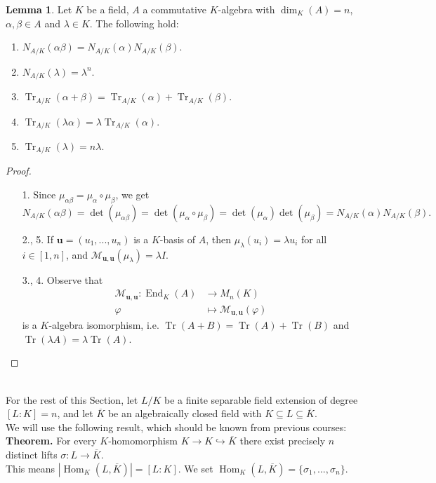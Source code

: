 \documentclass[12pt,a4paper]{report}
\theoremstyle{definition}
\newtheorem{lemma}[theorem]{Lemma}
\theoremstyle{num.custom-title}
\DeclareMathOperator{\Hom}{Hom}
\DeclareMathOperator{\End}{End}
\DeclareMathOperator{\sse}{\subseteq}
\DeclareMathOperator{\Tr}{Tr}
\newcommand{\ol}{\overline}
\newcommand{\M}{\mathcal{M}}
\renewcommand{\phi}{\varphi}
\renewcommand{\u}{\mathbf{u}}
\begin{document}
\begin{lemma}
Let $K$ be a field, $A$ a commutative $K$-algebra with $\dim_K(A)=n$, $\alpha,\beta \in A$ and $\lambda \in K$. The following hold:
\begin{enumerate}
\item $N_{A/K}(\alpha\beta)=N_{A/K}(\alpha)N_{A/K}(\beta)$.
\item $N_{A/K}(\lambda)=\lambda^n$.
\item $\Tr_{A/K}(\alpha + \beta) = \Tr_{A/K}(\alpha) + \Tr_{A/K}(\beta)$.
\item $\Tr_{A/K}(\lambda \alpha) = \lambda \Tr_{A/K}(\alpha)$.
\item $\Tr_{A/K}(\lambda) = n\lambda$.
\end{enumerate}
\begin{proof}\ 
\begin{itemize}
\item[1.] Since $\mu_{\alpha\beta}=\mu_\alpha \circ \mu_\beta$, we get
\[
N_{A/K}(\alpha\beta) = \det(\mu_{\alpha\beta}) = \det(\mu_\alpha \circ \mu_\beta) = \det(\mu_\alpha) \det(\mu_\beta) = N_{A/K}(\alpha) N_{A/K}(\beta).
\]
\item[2., 5.] If $\u=(u_1,...,u_n)$ is a $K$-basis of $A$, then $\mu_\lambda (u_i) = \lambda u_i$ for all $i \in [1,n]$, and $\M_{\u,\u}(\mu_\lambda) = \lambda I$.
\item[3., 4.] Observe that
\begin{align*}
\M_{\u,\u} \colon \End_K(A) &\to M_n(K) \\
\phi &\mapsto \M_{\u,\u}(\phi)
\end{align*}
is a $K$-algebra isomorphism, i.e. $\Tr(A+B) = \Tr(A) + \Tr(B)$ and $\Tr(\lambda A) = \lambda \Tr(A)$.
\end{itemize}
\end{proof}
\end{lemma}\ 
\\
\noindent For the rest of this Section, let $L/K$ be a finite separable field extension of degree $[L:K]=n$, and let $\ol{K}$ be an algebraically closed field with $K \sse L \sse \ol{K}$.\\
We will use the following result, which should be known from previous courses:\\
\textbf{Theorem.} For every $K$-homomorphism $K \to K \hookrightarrow \ol{K}$ there exist precisely $n$ distinct lifts $\sigma: L \to \ol{K}$.\\ This means $|\Hom_K(L,\ol{K})| = [L:K]$. We set $\Hom_K(L,\ol{K}) = \{\sigma_1,...,\sigma_n\}$.
\end{document}
